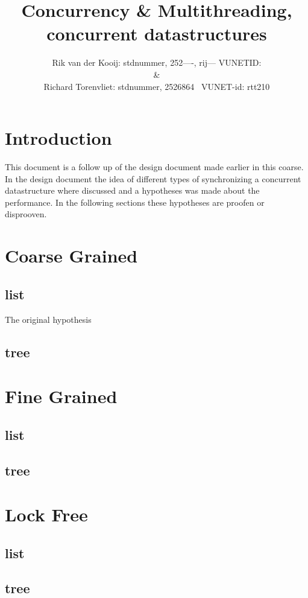 \documentclass[10pt,a4paper]{article}
\author{Rik van der Kooij: stdnummer, 252----, rij--- VUNETID: \\ \&  \\ Richard Torenvliet: stdnummer, 2526864 \ VUNET-id: rtt210}
\title{Concurrency \& Multithreading, concurrent datastructures}
\begin{document}
\maketitle
\tableofcontents
\section{Introduction}
This document is a follow up of the design document made earlier in this coarse. In the design document the idea of different types of synchronizing a concurrent datastructure where discussed and a hypotheses was made about the performance. In the following sections these hypotheses are proofen or disprooven.

\section{Coarse Grained}
\subsection{list}
The original hypothesis 
\subsection{tree}

\section{Fine Grained}
\subsection{list}
\subsection{tree}

\section{Lock Free}
\subsection{list}
\subsection{tree}
\end{document}
